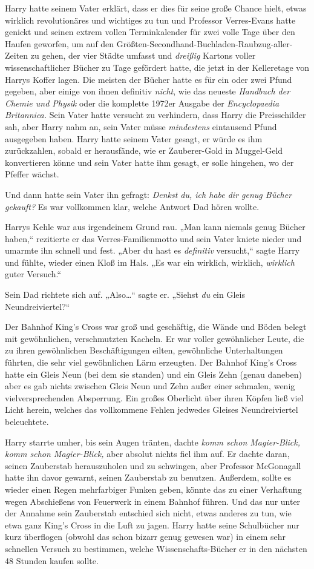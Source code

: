 {Harry hatte seinem Vater erklärt, dass er dies für seine große Chance hielt, etwas wirklich revolutionäres und wichtiges zu tun und Professor Verres-Evans hatte genickt und seinen extrem vollen Terminkalender für zwei volle Tage über den Haufen geworfen, um auf den Größten-Secondhand-Buchladen-Raubzug-aller-Zeiten zu gehen, der vier Städte umfasst und \emph{dreißig} Kartons voller wissenschaftlicher Bücher zu Tage gefördert hatte, die jetzt in der Kelleretage von Harrys Koffer lagen. Die meisten der Bücher hatte es für ein oder zwei Pfund gegeben, aber einige von ihnen definitiv \emph{nicht}, wie das neueste \emph{Handbuch der Chemie und Physik} oder die komplette 1972er Ausgabe der \emph{Encyclopaedia Britannica.} Sein Vater hatte versucht zu verhindern, dass Harry die Preisschilder sah, aber Harry nahm an, sein Vater müsse \emph{mindestens} eintausend Pfund ausgegeben haben. Harry hatte seinem Vater gesagt, er würde es ihm zurückzahlen, sobald er herausfände, wie er Zauberer-Gold in Muggel-Geld konvertieren könne und sein Vater hatte ihm gesagt, er solle hingehen, wo der Pfeffer wächst.

Und dann hatte sein Vater ihn gefragt: \emph{Denkst du, ich habe dir genug Bücher gekauft?} Es war vollkommen klar, welche Antwort Dad hören wollte.

Harrys Kehle war aus irgendeinem Grund rau. „Man kann niemals genug Bücher haben,“ rezitierte er das Verres-Familienmotto und sein Vater kniete nieder und umarmte ihn schnell und fest. „Aber du hast es \emph{definitiv} versucht,“ sagte Harry und fühlte, wieder einen Kloß im Hals. „Es war ein wirklich, wirklich, \emph{wirklich} guter Versuch.“

Sein Dad richtete sich auf. „Also…“ sagte er. „Siehst \emph{du} ein Gleis Neundreiviertel?“

Der Bahnhof King's Cross war groß und geschäftig, die Wände und Böden belegt mit gewöhnlichen, verschmutzten Kacheln. Er war voller gewöhnlicher Leute, die zu ihren gewöhnlichen Beschäftigungen eilten, gewöhnliche Unterhaltungen führten, die sehr viel gewöhnlichen Lärm erzeugten. Der Bahnhof King's Cross hatte ein Gleis Neun (bei dem sie standen) und ein Gleis Zehn (genau daneben) aber es gab nichts zwischen Gleis Neun und Zehn außer einer schmalen, wenig vielversprechenden Absperrung. Ein großes Oberlicht über ihren Köpfen ließ viel Licht herein, welches das vollkommene Fehlen jedwedes Gleises Neundreiviertel beleuchtete.

Harry starrte umher, bis sein Augen tränten, dachte \emph{komm schon Magier-Blick, komm schon Magier-Blick,} aber absolut nichts fiel ihm auf. Er dachte daran, seinen Zauberstab herauszuholen und zu schwingen, aber Professor McGonagall hatte ihn davor gewarnt, seinen Zauberstab zu benutzen. Außerdem, sollte es wieder einen Regen mehrfarbiger Funken geben, könnte das zu einer Verhaftung wegen Abschießens von Feuerwerk in einem Bahnhof führen. Und das nur unter der Annahme sein Zauberstab entschied sich nicht, etwas anderes zu tun, wie etwa ganz King's Cross in die Luft zu jagen. Harry hatte seine Schulbücher nur kurz überflogen (obwohl das schon bizarr genug gewesen war) in einem sehr schnellen Versuch zu bestimmen, welche Wissenschafts-Bücher er in den nächsten 48 Stunden kaufen sollte.

}
